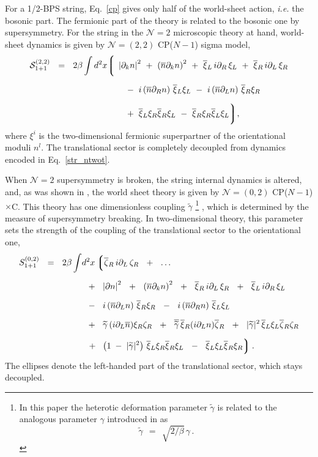 \documentclass[12pt]{article}
\newcommand{\ntwo}{${\mathcal N}=2$ }
\newcommand{\ntwot}{${\mathcal N}= \left(2,2\right) $ }
\newcommand{\ntwoo}{${\mathcal N}= \left(0,2\right) $ }
\newcommand{\p}{\partial}
\newcommand{\wt}{\widetilde}
\newcommand{\ov}{\overline}
\newcommand{\mc}[1]{\mathcal{#1}}
\newcommand{\lgr}{\left\lgroup}
\newcommand{\rgr}{\right\rgroup}
\newcommand{\bxir}{\ov{\xi}{}_R}
\newcommand{\bxil}{\ov{\xi}{}_L}
\newcommand{\xir}{\xi_R}
\newcommand{\xil}{\xi_L}
\newcommand{\bzl}{\ov{\zeta}{}_L}
\newcommand{\bzr}{\ov{\zeta}{}_R}
\newcommand{\zr}{\zeta_R}
\newcommand{\zl}{\zeta_L}
\newcommand{\nbar}{\ov{n}}
\newcommand{\CPCn}{CP($N-1$)$\times$C}
\newcommand{\tgamma}{\wt{\gamma}}
\begin{document}
	For a 1/2-BPS string, Eq.~\eqref{cp} gives only half of the world-sheet action, {\it i.e.} the bosonic part.
	The fermionic part of the theory is related to the bosonic one by supersymmetry.
	For the string in the \ntwo microscopic theory at hand, world-sheet dynamics is given 
	by \ntwot CP($N-1$) sigma model,
\begin{align}
%
\notag
\mc{S}_{\rm 1+1}^{\rm (2,2)}  ~~=~~ 2\beta
	\int  d^2x
	\biggl\lgroup\; 
	&
	\left|\p_k n \right|^2  ~+~ \left(\ov{n}\p_k n\right)^2  
	~+~ \ov{\xi}{}_L\, i\p_R\, \xi_L  ~+~ \ov{\xi}{}_R\, i\p_L\,  \xi_R 
	\\[2mm]
%
\label{str_ntwot}
	&\;
	~~-~
	i \left(\nbar\p_R n\right)\, \bxil\xil ~-~ i \left(\nbar\p_Ln\right) \, \bxir\xir 
	\\[2mm]
%
\notag
	&\;
		~~+~
		\bxil \xir \bxir \xil ~-~ \bxir \xir \bxil \xil
	\biggr\rgroup ,
\end{align}
	where $ \xi^i $ is the two-dimensional fermionic superpartner of the orientational moduli $ n^l $.
	The translational sector is completely decoupled from dynamics encoded in  Eq.~\eqref{str_ntwot}.

	When \ntwo supersymmetry is broken, the string internal dynamics is altered, and, as was shown
	in \cite{Edalati}, the world sheet theory is given by \ntwoo \CPCn.
	This theory has one dimensionless coupling $ \tgamma $
\footnote{
In this paper the heterotic deformation parameter $ \tgamma $ is related to the analogous parameter
$ \gamma $ introduced in \cite{SYhet} as 
\[
	\tgamma ~~=~~ \sqrt{2/\beta}\,\gamma\,.
\]}
 \cite{SYhet,BSYhet}, which is determined by the
	measure of supersymmetry breaking.
	In two-dimensional theory, this parameter sets the strength of the coupling of the translational
	sector to the orientational one,
\begin{align}
%
\notag
S_{1+1}^{(0,2)} ~~=~~ 2\beta
	\int & d^2 x 
\lgr
	\bzr\, i\p_L\, \zr ~~+~~ \dots 
\right.
	\\[2mm]
%
\notag
	&
	\;\;
	+~~
	\left|\p n\right|^2 ~~+~~ \left(\ov{n}\p_k n\right)^2 ~~+~~
	\bxir \, i\p_L \, \xir  ~~+~~ \bxil \, i\p_R \, \xil 
	\\[2mm]
%
\label{world02}
	&
	\;\;
	-~~
	i \left(\ov{n}\p_L n\right)\, \bxir \xir ~~-~~ 
	i \left(\ov{n}\p_R n\right)\, \bxil \xil  
	\\[2mm]
%
\notag
	&
	\;\;
	+~~
	\tgamma\, (i\p_L\nbar) \xir\zr ~~+~~ \ov{\tgamma}\, \bxir (i\p_L n) \bzr ~~+~~
	|\tgamma|^2\, \bxil\xil \bzr\zr  
	\\[2mm]
%
\notag
	&
	\;\;
\left.
	+~~ 
	\left( 1 \;-\; |\tgamma|^2 \right)\, \bxil\xir \bxir\xil  
	~~-~~ \bxil\xil \bxir\xir
\rgr .
\end{align}
	The ellipses denote the left-handed part of the translational sector, which stays decoupled.
\end{document}
